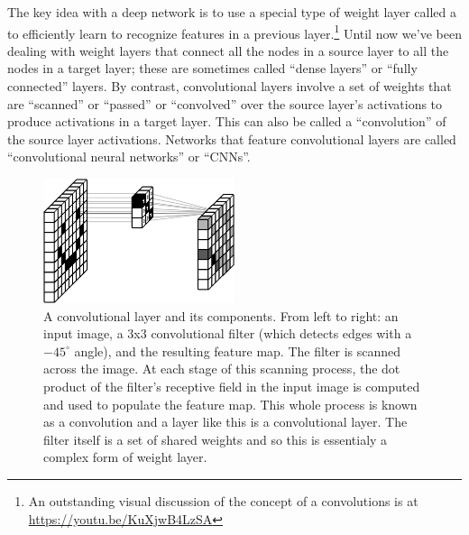 
The key idea with a deep network is to use a special type of weight layer called a  to efficiently learn to recognize features in a previous layer.\footnote{An outstanding visual discussion of the concept of a convolutions is at \url{https://youtu.be/KuXjwB4LzSA}} Until now we've been dealing with weight layers that connect all the nodes in a source layer to all the nodes in a target layer; these are sometimes called ``dense layers'' or ``fully connected'' layers. By contrast, convolutional layers involve a set of weights that are ``scanned'' or ``passed'' or ``convolved'' over the source layer's activations to produce activations in a target layer. This can also be called a ``convolution'' of the source layer activations. Networks that feature convolutional layers are called ``convolutional neural networks'' or ``CNNs''.

\begin{figure}[h]
\centering
\includegraphics[width=0.5\textwidth]{images/happyConvolution.png}
\caption[Soraya Boza, adapting this image from User Cecbur, \url{https://commons.wikimedia.org/wiki/File:Convolutional_Neural_Network_NeuralNetworkFilter.gif}, with labels added by Jeff Yoshimi.]{A convolutional layer and its components. From left to right: an input image, a 3x3 convolutional filter (which detects edges with a $-45^\circ$ angle), and the resulting feature map. The filter is scanned across the image. At each stage of this scanning process, the dot product of the filter's receptive field in the input image is computed and used to populate the feature map. This whole process is known as a convolution and a layer like this is a convolutional layer. The filter itself is a set of shared weights and so this is essentialy a complex form of weight layer.}
\label{cnn_filter}
\end{figure}

